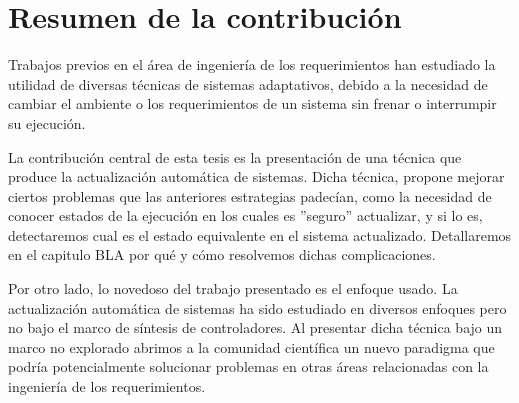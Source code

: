 \section{Resumen de la contribución}

Trabajos previos en el área de ingeniería de los requerimientos han estudiado la utilidad de diversas técnicas de sistemas
adaptativos, debido a la necesidad de cambiar el ambiente o los requerimientos de un sistema sin frenar o interrumpir su
ejecución.

La contribución central de esta tesis es la presentación de una técnica que produce la actualización automática de
sistemas. Dicha técnica, propone mejorar ciertos problemas que las anteriores estrategias padecían, como la necesidad de
conocer estados de la ejecución en los cuales es ''seguro'' actualizar, y si lo es, detectaremos cual es el estado
equivalente en el sistema actualizado. Detallaremos en el capitulo BLA por qué y cómo resolvemos dichas complicaciones.

Por otro lado, lo novedoso del trabajo presentado es el enfoque usado. La actualización automática de sistemas ha sido
estudiado en diversos enfoques pero no bajo el marco de síntesis de controladores. Al presentar dicha técnica bajo un
marco no explorado abrimos a la comunidad científica un nuevo paradigma que podría potencialmente solucionar problemas
en otras áreas relacionadas con la ingeniería de los requerimientos.

